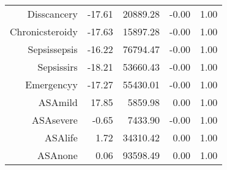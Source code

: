\begin{tabular}{rrrrr}
$$  Diss\-cancer\-y & -17.61 & 20889.28 & -0.00 & 1.00 \\ 
  Chronic\-steroid\-y & -17.63 & 15897.28 & -0.00 & 1.00 \\ 
  Sepsis\-sepsis & -16.22 & 76794.47 & -0.00 & 1.00 \\ 
  Sepsis\-sirs & -18.21 & 53660.43 & -0.00 & 1.00 \\ 
  Emergency\-y & -17.27 & 55430.01 & -0.00 & 1.00 \\ 
  ASA\-mild & 17.85 & 5859.98 & 0.00 & 1.00 \\ 
  ASA\-severe & -0.65 & 7433.90 & -0.00 & 1.00 \\ 
  ASA\-life & 1.72 & 34310.42 & 0.00 & 1.00 \\ 
  ASA\-none & 0.06 & 93598.49 & 0.00 & 1.00 \\ 
   \hline
\end{tabular}

